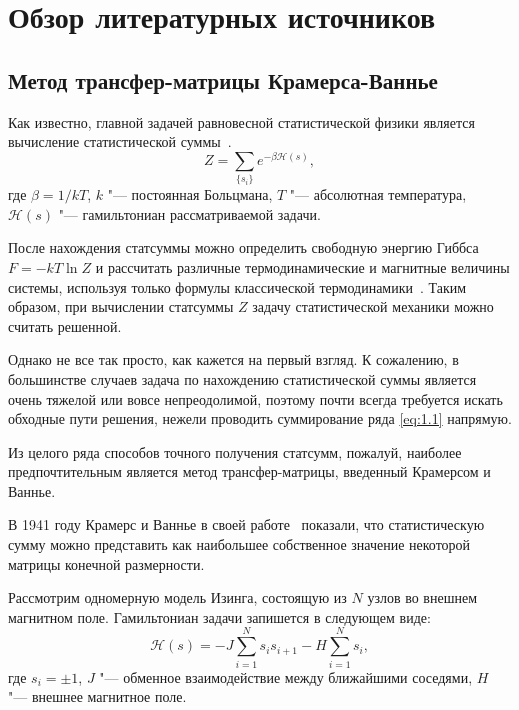 \chapter{Обзор литературных источников}\label{ch:ch1}

\section{Метод трансфер-матрицы Крамерса-Ваннье}\label{sec:ch1/sec1}

Как известно, главной задачей равновесной статистической физики является вычисление статистической суммы~\cite{feynmann1972, isihara1973, huang1973, kubo1967}.
\begin{equation}
Z=\sum_{\{s_{i}\}}e^{-\beta \mathcal{H}(s)}, 
\label{eq:1.1}
\end{equation}
где $\beta = 1/kT$, $k$ "--- постоянная Больцмана, $T$ "--- абсолютная температура, $\mathcal{H}(s)$ "--- гамильтониан рассматриваемой задачи.

После нахождения статсуммы можно определить свободную энергию Гиббса $F=-kT \ln Z$ и рассчитать различные термодинамические и магнитные величины системы, используя только формулы классической термодинамики~\cite{feynmann1972, isihara1973, huang1973, kubo1967}. Таким образом, при вычислении статсуммы $Z$ задачу статистической механики можно считать решенной.

Однако не все так просто, как кажется на первый взгляд. К сожалению, в большинстве случаев задача по нахождению статистической суммы является очень тяжелой или вовсе непреодолимой, поэтому почти всегда требуется искать обходные пути решения, нежели проводить суммирование ряда \eqref{eq:1.1} напрямую.

Из целого ряда способов точного получения статсумм, пожалуй, наиболее предпочтительным является метод трансфер-матрицы, введенный Крамерсом и Ваннье. 

В 1941 году Крамерс и Ваннье в своей работе~\cite{kramers_wannier1,kramers_wannier2} показали, что статистическую сумму можно представить как наибольшее собственное значение некоторой матрицы конечной размерности.

Рассмотрим одномерную модель Изинга, состоящую из $N$ узлов во внешнем магнитном поле. Гамильтониан задачи запишется в следующем виде:
\begin{equation}
\mathcal{H}(s) = -J\sum_{i=1}^{N} s_{i}s_{i+1}-H\sum_{i=1}^{N} s_{i},
\label{eq:1.2}
\end{equation}
где $s_{i}=\pm 1$, $J$ "--- обменное взаимодействие между ближайшими соседями,
$H$ "--- внешнее магнитное поле.


